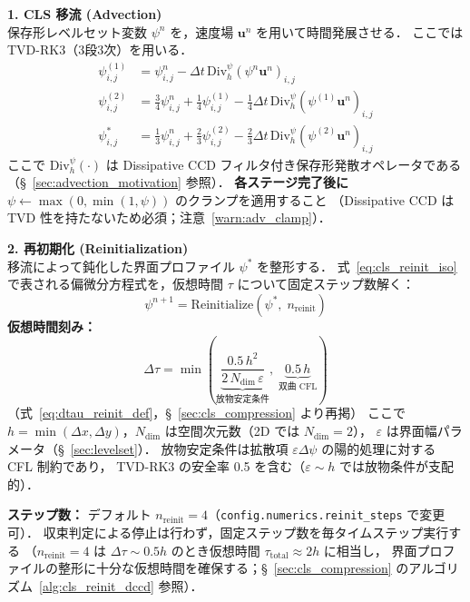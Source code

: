 \textbf{1. CLS 移流 (Advection)} \\
保存形レベルセット変数 $\psi^n$ を，速度場 $\bm{u}^n$ を用いて時間発展させる．
ここでは TVD-RK3（3段3次）を用いる．
\begin{align*}
  \psi^{(1)}_{i,j} &= \psi^n_{i,j} - \Delta t \, \text{Div}_h^{\psi}(\psi^n \bm{u}^n)_{i,j} \\
  \psi^{(2)}_{i,j} &= \frac{3}{4}\psi^n_{i,j} + \frac{1}{4}\psi^{(1)}_{i,j} - \frac{1}{4}\Delta t \, \text{Div}_h^{\psi}(\psi^{(1)} \bm{u}^n)_{i,j} \\
  \psi^*_{i,j} &= \frac{1}{3}\psi^n_{i,j} + \frac{2}{3}\psi^{(2)}_{i,j} - \frac{2}{3}\Delta t \, \text{Div}_h^{\psi}(\psi^{(2)} \bm{u}^n)_{i,j}
\end{align*}
ここで $\text{Div}_h^{\psi}(\cdot)$ は Dissipative CCD フィルタ付き保存形発散オペレータである（§~\ref{sec:advection_motivation} 参照）．
\textbf{各ステージ完了後に} $\psi \leftarrow \max(0,\min(1,\psi))$ のクランプを適用すること
（Dissipative CCD は TVD 性を持たないため必須；注意~\ref{warn:adv_clamp}）．

\textbf{2. 再初期化 (Reinitialization)} \\
移流によって鈍化した界面プロファイル $\psi^*$ を整形する．
式~\eqref{eq:cls_reinit_iso} で表される偏微分方程式を，仮想時間 $\tau$ について固定ステップ数解く：
\[ \psi^{n+1} = \text{Reinitialize}(\psi^*,\; n_{\mathrm{reinit}}) \]
\textbf{仮想時間刻み：}
\begin{equation}
  \Delta\tau = \min\!\left(
    \underbrace{\frac{0.5\,h^2}{2\,N_{\mathrm{dim}}\,\varepsilon}}_{\text{放物安定条件}},\;
    \underbrace{0.5\,h}_{\text{双曲 CFL}}
  \right)
\end{equation}
（式~\eqref{eq:dtau_reinit_def}，§~\ref{sec:cls_compression} より再掲）
ここで $h = \min(\Delta x, \Delta y)$，$N_{\mathrm{dim}}$ は空間次元数（2D では $N_{\mathrm{dim}}=2$），
$\varepsilon$ は界面幅パラメータ（§~\ref{sec:levelset}）．
放物安定条件は拡散項 $\varepsilon\Delta\psi$ の陽的処理に対する CFL 制約であり，
TVD-RK3 の安全率 0.5 を含む（$\varepsilon \sim h$ では放物条件が支配的）．

\textbf{ステップ数：} デフォルト $n_{\mathrm{reinit}} = 4$（\texttt{config.numerics.reinit\_steps} で変更可）．
収束判定による停止は行わず，固定ステップ数を毎タイムステップ実行する
（$n_{\mathrm{reinit}} = 4$ は $\Delta\tau \sim 0.5h$ のとき仮想時間 $\tau_{\mathrm{total}} \approx 2h$ に相当し，
界面プロファイルの整形に十分な仮想時間を確保する；§~\ref{sec:cls_compression} のアルゴリズム~\ref{alg:cls_reinit_dccd} 参照）．

